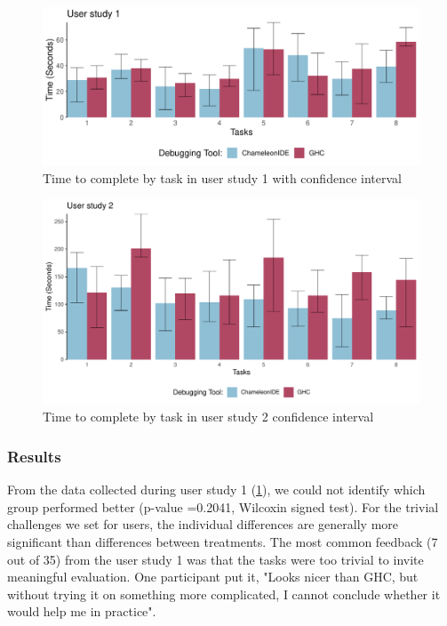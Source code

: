 
\begin{figure}[h]
    \centering
    \includegraphics[width=\linewidth]{images/r1-data.pdf}
    \caption{Time to complete by task in user study 1 with confidence interval}
    \label{fig:r1-analysis}
\end{figure}


\begin{figure}[h]
    \centering
    \includegraphics[width=\linewidth]{images/r2-data.pdf}
    \caption{Time to complete by task in user study 2 confidence interval}
    \label{fig:r2-analysis}
\end{figure}

\subsubsection*{\textbf {Results}}

From the data collected during user study 1 (\ref{fig:r1-analysis}), we could not identify which group performed better (p-value =0.2041, Wilcoxin signed test). For the trivial challenges we set for users, the individual differences are generally more significant than differences between treatments. 
The most common feedback (7 out of 35) from the user study 1 was that the tasks were too trivial to invite meaningful evaluation. One participant put it, "Looks nicer than GHC, but without trying it on something more complicated, I cannot conclude whether it would help me in practice".


